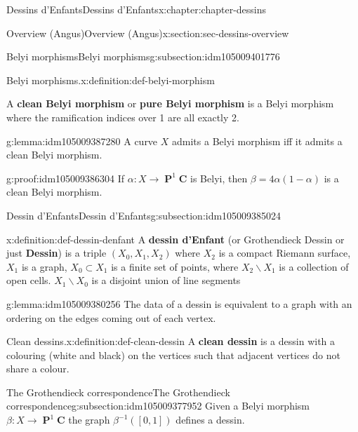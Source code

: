 \documentclass[oneside,10pt,]{book}
\newcommand{\terminology}[1]{\textbf{#1}}
\numberwithin{equation}{section}
\newcommand{\lb}{[}
\newcommand{\rb}{]}
\newcommand{\CC}{\mathbf{C}}
\DeclareMathOperator{\PP}{\mathbf{P}}
\begin{document}
\begin{chapterptx}{Dessins d'Enfants}{}{Dessins d'Enfants}{}{}{x:chapter:chapter-dessins}
\begin{sectionptx}{Overview (Angus)}{}{Overview (Angus)}{}{}{x:section:sec-dessins-overview}
\begin{subsectionptx}{Belyi morphisms}{}{Belyi morphisms}{}{}{g:subsection:idm105009401776}
\begin{definition}{Belyi morphisms.}{x:definition:def-belyi-morphism}
\par
A \terminology{clean Belyi morphism} or \terminology{pure Belyi morphism} is a Belyi morphism where the ramification indices over 1 are all exactly 2.%
\end{definition}
\begin{lemma}{}{}{g:lemma:idm105009387280}%
A curve \(X\) admits a Belyi morphism iff it admits a clean Belyi morphism.%
\end{lemma}
\begin{proofptx}{}{g:proof:idm105009386304}
If \(\alpha \colon X\to \PP^1 \CC\) is Belyi, then \(\beta = 4\alpha(1-\alpha)\) is a clean Belyi morphism.%
\end{proofptx}
\end{subsectionptx}
%
%
\typeout{************************************************}
\typeout{************************************************}
%
\begin{subsectionptx}{Dessin d'Enfants}{}{Dessin d'Enfants}{}{}{g:subsection:idm105009385024}
\begin{definition}{}{x:definition:def-dessin-denfant}%
A \terminology{dessin d'Enfant} (or Grothendieck Dessin or just \terminology{Dessin}) is a triple \((X_0,X_1,X_2)\) where \(X_2\) is a compact Riemann surface, \(X_1\) is a graph, \(X_0 \subset X_1\) is a finite set of points, where \(X_2 \smallsetminus X_1\) is a collection of open cells. \(X_1 \smallsetminus X_0\) is a disjoint union of line segments%
\end{definition}
\begin{lemma}{}{}{g:lemma:idm105009380256}%
The data of a dessin is equivalent to a graph with an ordering on the edges coming out of each vertex.%
\end{lemma}
\begin{definition}{Clean dessins.}{x:definition:def-clean-dessin}%
A \terminology{clean dessin} is a dessin with a colouring (white and black) on the vertices such that adjacent vertices do not share a colour.%
\end{definition}
\end{subsectionptx}
%
%
\typeout{************************************************}
\typeout{************************************************}
%
\begin{subsectionptx}{The Grothendieck correspondence}{}{The Grothendieck correspondence}{}{}{g:subsection:idm105009377952}
Given a Belyi morphism \(\beta\colon X \to \PP^1 \CC\) the graph \(\beta^{-1}(\lb 0,1\rb)\) defines a dessin.%

\end{subsectionptx}
\end{sectionptx}
\end{chapterptx}
\end{document}
